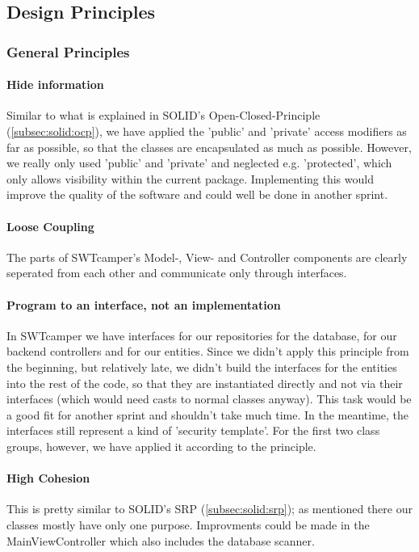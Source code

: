 \subsection{Design Principles}

\subsubsection{General Principles}

\paragraph{Hide information}
Similar to what is explained in SOLID's Open-Closed-Principle (\ref{subsec:solid:ocp}), we have applied the 'public' and 'private' access modifiers as far as possible, so that the classes are encapsulated as much as possible. However, we really only used 'public' and 'private' and neglected e.g. 'protected', which only allows visibility within the current package. Implementing this would improve the quality of the software and could well be done in another sprint.

\paragraph{Loose Coupling}
The parts of SWTcamper's Model-, View- and Controller components are clearly seperated from each other and communicate only through interfaces.

\paragraph{Program to an interface, not an implementation}
In SWTcamper we have interfaces for our repositories for the database, for our backend controllers and for our entities. Since we didn't apply this principle from the beginning, but relatively late, we didn't build the interfaces for the entities into the rest of the code, so that they are instantiated directly and not via their interfaces (which would need casts to normal classes anyway). This task would be a good fit for another sprint and shouldn't take much time. In the meantime, the interfaces still represent a kind of 'security template'. For the first two class groups, however, we have applied it according to the principle.

\paragraph{High Cohesion}
This is pretty similar to SOLID's SRP (\ref{subsec:solid:srp}); as mentioned there our classes mostly have only one purpose. Improvments could be made in the MainViewController which also includes the database scanner.

